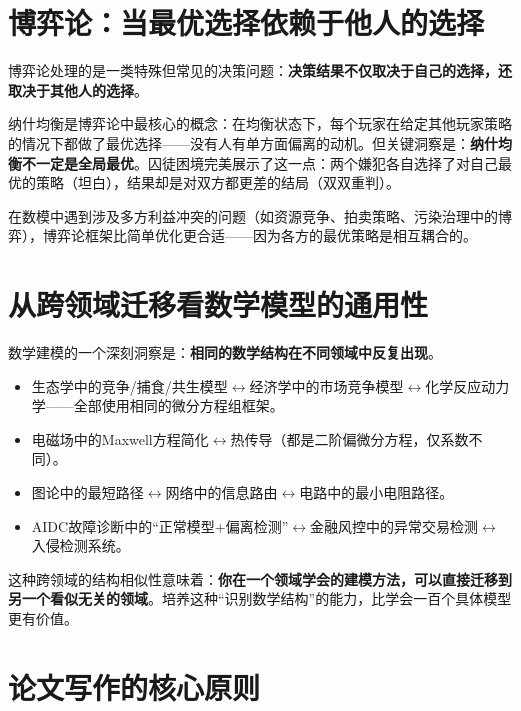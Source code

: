 \documentclass[12pt,a4paper]{ctexart}
\begin{document}
\section{博弈论：当最优选择依赖于他人的选择}

博弈论处理的是一类特殊但常见的决策问题：\textbf{决策结果不仅取决于自己的选择，还取决于其他人的选择}。

纳什均衡是博弈论中最核心的概念：在均衡状态下，每个玩家在给定其他玩家策略的情况下都做了最优选择——没有人有单方面偏离的动机。但关键洞察是：\textbf{纳什均衡不一定是全局最优}。囚徒困境完美展示了这一点：两个嫌犯各自选择了对自己最优的策略（坦白），结果却是对双方都更差的结局（双双重判）。

在数模中遇到涉及多方利益冲突的问题（如资源竞争、拍卖策略、污染治理中的博弈），博弈论框架比简单优化更合适——因为各方的最优策略是相互耦合的。

\section{从跨领域迁移看数学模型的通用性}

数学建模的一个深刻洞察是：\textbf{相同的数学结构在不同领域中反复出现}。

\begin{itemize}[nosep]
    \item 生态学中的竞争/捕食/共生模型$\leftrightarrow$经济学中的市场竞争模型$\leftrightarrow$化学反应动力学——全部使用相同的微分方程组框架。
    \item 电磁场中的Maxwell方程简化$\leftrightarrow$热传导（都是二阶偏微分方程，仅系数不同）。
    \item 图论中的最短路径$\leftrightarrow$网络中的信息路由$\leftrightarrow$电路中的最小电阻路径。
    \item AIDC故障诊断中的``正常模型+偏离检测''$\leftrightarrow$金融风控中的异常交易检测$\leftrightarrow$入侵检测系统。
\end{itemize}

这种跨领域的结构相似性意味着：\textbf{你在一个领域学会的建模方法，可以直接迁移到另一个看似无关的领域}。培养这种``识别数学结构''的能力，比学会一百个具体模型更有价值。

\section{论文写作的核心原则}
\end{document}
